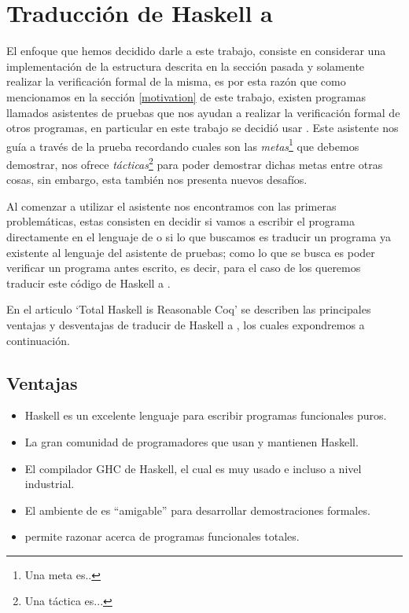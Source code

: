 \section{Traducción de Haskell a {\coq}}
El enfoque que hemos decidido darle a este trabajo, consiste en considerar una implementaci\'on de la estructura descrita en la secci\'on pasada y solamente realizar la verificaci\'on formal de la misma, es por esta raz\'on que como mencionamos en la secci\'on \ref{motivation} de este trabajo, existen programas llamados asistentes de pruebas que nos ayudan a realizar la
verificaci\'on formal de otros programas, en particular en este
trabajo se decidió usar {\coq}. Este asistente nos gu\'ia a través de la prueba recordando cuales
son las \textit{metas}\footnote{Una meta es..} que debemos demostrar, nos ofrece \textit{t\'acticas}\footnote{Una táctica es...} para poder demostrar dichas metas
entre otras cosas, sin embargo, esta tambi\'en nos presenta nuevos desaf\'ios.

Al comenzar a utilizar el asistente nos encontramos con las primeras problem\'aticas, estas
consisten en decidir si vamos a escribir el programa directamente en el lenguaje de {\coq} o si lo que
buscamos es traducir un programa ya existente al lenguaje del asistente de pruebas; como lo que se
busca es poder verificar un programa antes escrito, es decir, para el caso de los {\arns} queremos traducir
este código de Haskell a {\coq}.

En el articulo `Total Haskell is Reasonable Coq' \cite{thrc} se describen las principales ventajas
y desventajas de traducir de Haskell a {\coq}, los cuales expondremos a continuaci\'on.

\subsection{Ventajas}
\begin{itemize}
    \item Haskell es un excelente lenguaje para escribir programas funcionales puros.
    \item La gran comunidad de programadores que usan y mantienen Haskell.
    \item El compilador GHC de Haskell, el cual es muy usado e incluso a nivel industrial.
    \item El ambiente de {\coq} es ``amigable'' para desarrollar demostraciones formales.
    \item {\coq} permite razonar acerca de programas funcionales totales.
\end{itemize}

